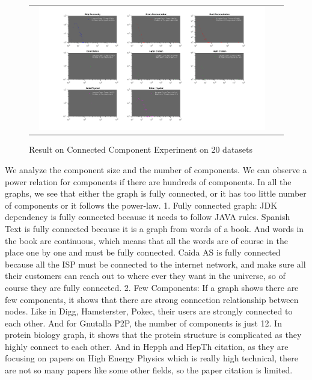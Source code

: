 \begin{figure}[H]
\begin{center}
\begin{tabular}{cc}
     \includegraphics[width=0.95\textwidth]{FIG/cc2 2.png}
\end{tabular}
\caption{Result on Connected Component Experiment on 20 datasets}
\end{center}
\end{figure}

We analyze the component size and the number of components. We can observe a power relation for components if there are hundreds of components. In all the graphs, we see that either the graph is fully connected, or it has too little number of components or it follows the power-law.
1. Fully connected graph: 
JDK dependency is fully connected because it needs to follow JAVA rules.
Spanish Text is fully connected because it is a graph from words of a book. And words in the book are continuous, which means that all the words are of course in the place one by one and must be fully connected.
Caida AS is fully connected because all the ISP must be connected to the internet network, and make sure all their customers can reach out to where ever they want in the universe, so of course they are fully connected.
2. Few Components:
If a graph shows there are few components, it shows that there are strong connection relationship between nodes. Like in Digg, Hamsterster, Pokec, their users are strongly connected to each other. And for Gnutalla P2P, the number of components is just 12. In protein biology graph, it shows that the protein structure is complicated as they highly connect to each other. And in Hepph and HepTh citation, as they are focusing on papers on High Energy Physics which is really high technical, there are not so many papers like some other fields, so the paper citation is limited.


